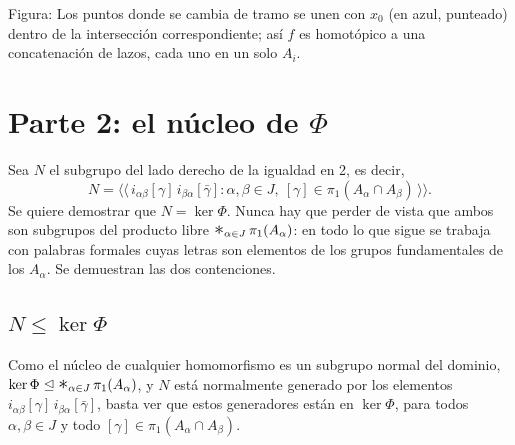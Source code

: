 \documentclass[11pt]{article}
\begin{document}
\begin{center}
\end{center}

\noindent Figura: Los puntos donde se cambia de tramo se unen con $x_0$ (en azul, punteado) dentro de la intersección correspondiente; así $f$ es homotópico a una concatenación de lazos, cada uno en un solo $A_i$.

\section*{Parte 2: el núcleo de $\Phi$}

Sea $N$ el subgrupo del lado derecho de la igualdad en 2, es decir,
\[
  N=\bigl\langle\!\bigl\langle\, i_{\alpha\beta}[\gamma]\,i_{\beta\alpha}[\bar\gamma] : \alpha,\beta\in J,\ [\gamma]\in\pi_1(A_\alpha\cap A_\beta)\,\bigr\rangle\!\bigr\rangle.
\]
Se quiere demostrar que $N=\ker\Phi$. Nunca hay que perder de vista que ambos son subgrupos del producto libre $\mathop{\scalebox{1.4}{$*$}}_{\alpha\in J}\pi_1(A_\alpha)$: en todo lo que sigue se trabaja con palabras formales cuyas letras son elementos de los grupos fundamentales de los $A_\alpha$. Se demuestran las dos contenciones.

\subsection*{$N\leq\ker\Phi$}

Como el núcleo de cualquier homomorfismo es un subgrupo normal del dominio, $\ker\Phi\trianglelefteq \mathop{\scalebox{1.4}{$*$}}_{\alpha\in J}\pi_1(A_\alpha)$, y $N$ está normalmente generado por los elementos $i_{\alpha\beta}[\gamma]\,i_{\beta\alpha}[\bar\gamma]$, basta ver que estos generadores están en $\ker\Phi$, para todos $\alpha,\beta\in J$ y todo $[\gamma]\in\pi_1(A_\alpha\cap A_\beta)$.
\end{document}
